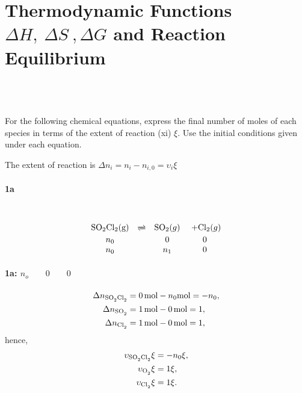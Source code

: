 \documentclass[main.tex]{subfiles}
\begin{document}
\section{Thermodynamic Functions $\Delta H,~\Delta S~,\Delta G$ and Reaction Equilibrium}

\subsection{~}
For the following chemical equations, express the final number of moles of each species in terms of the extent of reaction (xi) $\xi$.
Use the initial conditions given under each equation.

The extent of reaction is $\Delta n_i = n_i - n_{i,0}=\upsilon_i\xi$

\paragraph{1a}~%
\begin{gather*}
\begin{array}{cccc}
    \mathrm{SO}_2\mathrm{Cl}_2(\mathrm{g}) & \xrightleftharpoons & \mathrm{SO}_2(g) &~+ \mathrm{Cl}_2(g) \\
    n_0 & & 0 & 0\\
    n_0 & & n_1 & 0\\
\end{array}    
\end{gather*}

\paragraph{1a: $n_o\qquad 0 \qquad 0$}
\begin{align*}
    \Delta n_{\ce{SO2Cl2}} &= \SI{0}{\mole} - n_0\SI{}{\mole} = -n_0, \\
    \Delta n_{\ce{SO2}} &= \SI{1}{\mole} - \SI{0}{\mole} = 1, \\
    \Delta n_{\ce{Cl2}} &= \SI{1}{\mole} - \SI{0}{\mole} = 1,
\end{align*}
hence,
\begin{align*}
    \upsilon_{\ce{SO2Cl2}}\xi &= -n_0\xi, \\
    \upsilon_{\ce{O2}}\xi &= 1\xi, \\
    \upsilon_{\ce{Cl2}}\xi &= 1\xi.
\end{align*}
\end{document}
